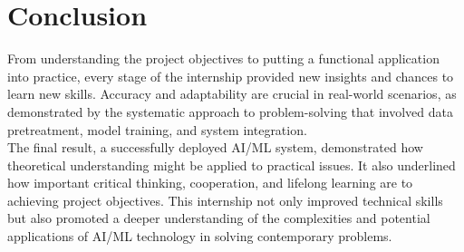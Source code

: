 \section{Conclusion}
From understanding the project objectives to putting a functional application into practice, every stage of the internship provided new insights and chances to learn new skills. Accuracy and adaptability are crucial in real-world scenarios, as demonstrated by the systematic approach to problem-solving that involved data pretreatment, model training, and system integration.\\
The final result, a successfully deployed AI/ML system, demonstrated how theoretical understanding might be applied to practical issues. It also underlined how important critical thinking, cooperation, and lifelong learning are to achieving project objectives. This internship not only improved technical skills but also promoted a deeper understanding of the complexities and potential applications of AI/ML technology in solving contemporary problems.
